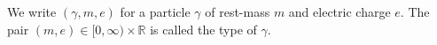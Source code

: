 We write $(\gamma, m, e)$ for a particle $\gamma$ of rest-mass $m$ and electric charge $e$. The pair $(m, e) \in [0, \infty) \times \mathbb{R}$ is called the type of $\gamma$.
